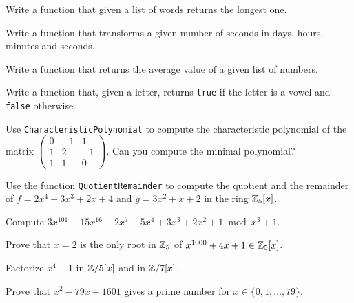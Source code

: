 \begin{prob}
	Write a function that given a list of words returns the longest one. 
\end{prob}

\begin{prob}
	Write a function that transforms a given number of seconds in days, hours,
	minutes and seconds.
\end{prob}

\begin{prob}
	Write a function that returns the average value of a given list of numbers.
\end{prob}

\begin{prob}
	Write a function that, given a letter, returns \lstinline{true} if the
	letter is a vowel and \lstinline{false} otherwise.
\end{prob}

\begin{prob}
	\label{prob:charmin}
	Use \lstinline{CharacteristicPolynomial} to compute the characteristic
	polynomial of the matrix
	$\begin{pmatrix}
		0 & -1 & 1\\
		1 & 2 & -1\\
		1 & 1 & 0
	\end{pmatrix}$.
	Can you compute the minimal polynomial?
\end{prob}

\begin{prob}
	\label{prob:division}
	Use the function \lstinline{QuotientRemainder} to compute the quotient and
	the remainder of $f=2x^4+3x^3+2x+4$ and $g=3x^2+x+2$ in the ring $\mathbb{Z}_5[x]$. 
\end{prob}

\begin{prob}
	\label{prob:mod}
	Compute $3x^{101}-15x^{16}-2x^7-5x^4+3x^3+2x^2+1\bmod x^3+1$. 
\end{prob}

\begin{prob}
	\label{prob:roots}
	Prove that $x=2$ is the only root in $\mathbb{Z}_5$ of $x^{1000}+4x+1\in\mathbb{Z}_5[x]$.
\end{prob}

\begin{prob}
	\label{prob:factors}
	Factorize $x^4-1$ in $\mathbb{Z}/5[x]$ and in $\mathbb{Z}/7[x]$.
\end{prob}

\begin{prob}
	\label{prob:primes}
	Prove that $x^2-79x+1601$ gives a prime number for
	$x\in\{0,1,\dots,79\}$.
\end{prob}

